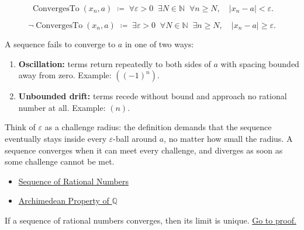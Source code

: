 \begin{remark*}
\[
\operatorname{ConvergesTo}(x_n, a)
\;\coloneqq\;
\forall \varepsilon > 0 \;\; \exists N \in \mathbb{N} \;\; \forall n \geq N,
\quad |x_n - a| < \varepsilon.
\]
\end{remark*}

\begin{remark*}
\[
\neg\operatorname{ConvergesTo}(x_n, a)
\;\coloneqq\;
\exists \varepsilon > 0 \;\; \forall N \in \mathbb{N} \;\; \exists n \geq N,
\quad |x_n - a| \geq \varepsilon.
\]
\end{remark*}

\begin{remark*}
A sequence fails to converge to $a$ in one of two ways:
\begin{enumerate}
  \item \textbf{Oscillation:} terms return repeatedly to both sides of $a$
        with spacing bounded away from zero. Example: $((-1)^n)$.
  \item \textbf{Unbounded drift:} terms recede without bound and approach
        no rational number at all. Example: $(n)$.
\end{enumerate}
\end{remark*}

\begin{remark*}[Interpretation]
Think of $\varepsilon$ as a challenge radius: the definition demands that the
sequence eventually stays inside every $\varepsilon$-ball around $a$, no
matter how small the radius. A sequence converges when it can meet every
challenge, and diverges as soon as some challenge cannot be met.
\end{remark*}

\begin{remark*}[Dependencies]
\begin{itemize}
  \item \hyperref[def:rational-sequence]{Sequence of Rational Numbers}
  \item \hyperref[thm:archimedean-q]{Archimedean Property of $\mathbb{Q}$}
\end{itemize}
\end{remark*}

\begin{theorem}
\label{thm:limit-unique-q}
If a sequence of rational numbers converges, then its limit is unique.
\hyperref[prf:limit-unique-q]{Go to proof.}
\end{theorem}

